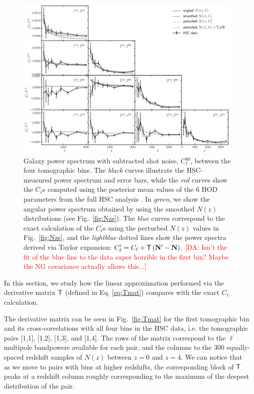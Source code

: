 \documentclass[a4paper,11pt]{article}
\newcommand{\da}[1]{{\textcolor{red}{[DA: #1]}}}
\newcommand{\vN}{\mathbf{N}}
\begin{document}
      \begin{figure}[ht]
        \centering
        \includegraphics[width=1.\textwidth]{./Cls}
        \caption{Galaxy power spectrum with subtracted shot noise, $C_\ell^{gg}$, between the four tomographic bins. The \textit{black} curves illustrate the HSC-measured power spectrum and error bars, while the \textit{red} curves show the $C_\ell$s computed using the posterior mean values of the 6 HOD parameters from the full HSC analysis \cite{1912.08209}. In \textit{green}, we show the angular power spectrum obtained by using the smoothed $N(z)$ distributions (see Fig.~\ref{fig:Nzs}). The \textit{blue} curves correspond to the exact calculation of the $C_\ell$s using the perturbed $N(z)$ values in Fig.~\ref{fig:Nzs}, and the \textit{lightblue} dotted lines show the power spectra derived via Taylor expansion: $C_\ell' = C_\ell + {\sf T} \left(\vN' - {\vN} \right)$. \da{Isn't the fit of the blue line to the data super horrible in the first bin? Maybe the NG covariance actually allows this...}}\label{fig:Cls}
      \end{figure}

      In this section, we study how the linear approximation performed via the derivative matrix ${\sf T}$ (defined in Eq. \ref{eq:Tmat}) compares with the exact $C_\ell$ calculation.
      
      The derivative matrix can be seen in Fig.~\ref{fig:Tmat} for the first tomographic bin and its cross-correlations with all four bins in the HSC data, i.e. the tomographic pairs [1,1], [1,2], [1,3], and [1,4]. The rows of the matrix correspond to the $\ell$ multipole bandpowers available for each pair, and the columns to the 300 equally-spaced redshift samples of $N(z)$ between $z = 0$ and $z = 4$. We can notice that as we move to pairs with bins at higher redshifts, the corresponding block of ${\sf T}$ peaks at a redshift column roughly corresponding to the maximum of the deepest distribution of the pair.
      
\end{document}
